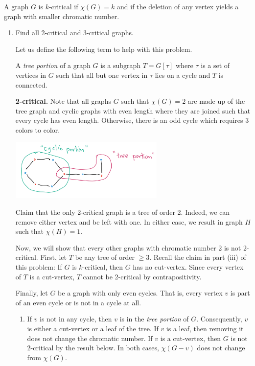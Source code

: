 \setcounter{question}{3}
\question A graph \(G\) is \(k\)-critical if \(\chi(G)=k\) and if
  the deletion of any vertex yields a graph with smaller chromatic
  number.
  \begin{enumerate}[label=(\roman*)]
    \item Find all 2-critical and 3-critical graphs.
      \begin{solution} 
        Let us define the following term to help with this
        problem.

        \begin{definition}
          A \textit{tree portion} of a graph \(G\) is a
          subgraph \(T = G[\tau]\) where \(\tau\) is a set of
          vertices in \(G\) such that all but one vertex in
          \(\tau\) lies on a cycle and \(T\) is connected.
        \end{definition}
        
        \textbf{2-critical.} Note that all graphs \(G\) such that
        \(\chi(G) = 2\) are made up of the tree graph and cyclic
        graphs with even length where they are joined such that
        every cycle has even length. Otherwise, there is an odd
        cycle which requires 3 colors to color.

        \begin{center}
          \includegraphics[width=0.6\textwidth]{figures/2-colorable}
        \end{center}

        Claim that the only 2-critical graph is a tree of order
        2. Indeed, we can remove either vertex and be left with
        one. In either case, we result in graph \(H\) such that
        \(\chi(H) = 1\).

        Now, we will show that every other graphs with chromatic
        number 2 is not 2-critical. First, let \(T\) be any tree
        of order \(\geq3\). Recall the claim in part (iii) of this
        problem: If \(G\) is \(k\)-critical, then \(G\) has no
        cut-vertex. Since every vertex of \(T\) is a cut-vertex,
        \(T\) cannot be 2-critical by contrapositivity.

        Finally, let \(G\) be a graph with only even cycles. That
        is, every vertex \(v\) is part of an even cycle or is not
        in a cycle at all.
        \begin{enumerate}
          \item If \(v\) is not in any cycle, then \(v\) is in
            the \textit{tree portion} of \(G\). Consequently,
            \(v\) is either a cut-vertex or a leaf of the tree.
            If \(v\) is a leaf, then removing it does not change
            the chromatic number. If \(v\) is a cut-vertex, then
            \(G\) is not 2-critical by the result below. In both
            cases, \(\chi(G - v)\) does not change from
            \(\chi(G)\).


\end{enumerate}
\end{solution}
\end{enumerate}
